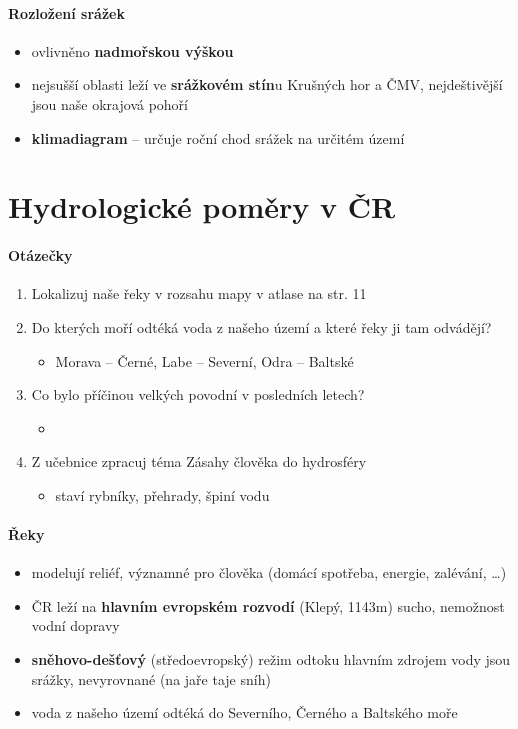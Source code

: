 \paragraph{Rozložení srážek}
\begin{itemize}
\item ovlivněno \textbf{nadmořskou výškou}
\item nejsušší oblasti leží ve \textbf{srážkovém stín}u Krušných hor a ČMV, nejdeštivější jsou naše okrajová pohoří
\item \textbf{klimadiagram} -- určuje roční chod srážek na určitém území
\end{itemize}

\section{Hydrologické poměry v ČR}
\paragraph{Otázečky}
\begin{enumerate}
\item Lokalizuj naše řeky v rozsahu mapy v atlase na str. 11
\item Do kterých moří odtéká voda z našeho území a které řeky ji tam odvádějí?
	\begin{itemize}
	\item Morava -- Černé, Labe -- Severní, Odra -- Baltské
	\end{itemize}
\item Co bylo příčinou velkých povodní v posledních letech?
	\begin{itemize}
	\item 
	\end{itemize}
\item Z učebnice zpracuj téma Zásahy člověka do hydrosféry
	\begin{itemize}
	\item staví rybníky, přehrady, špiní vodu
	\end{itemize}
\end{enumerate}

\paragraph{Řeky}
\begin{itemize}
\item modelují reliéf, významné pro člověka (domácí spotřeba, energie, zalévání, \ldots)
\item ČR leží na \textbf{hlavním evropském rozvodí} (Klepý, 1143m) \ra sucho, nemožnost vodní dopravy
\item \textbf{sněhovo-dešťový} (středoevropský) režim odtoku \ra hlavním zdrojem vody jsou srážky, nevyrovnané (na jaře taje sníh)
\item voda z našeho území odtéká do Severního, Černého a Baltského moře
\end{itemize}

